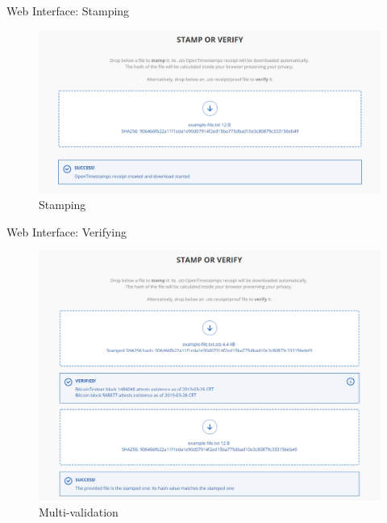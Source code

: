 \documentclass[usenames,dvipsnames]{beamer}
\begin{document}
     \begin{frame}{Web Interface: Stamping}
     \begin{figure}
         \centering
         \includegraphics[width=1\linewidth]{Images/stamping.png}
         \caption{Stamping}
         
     \end{figure}
    \end{frame}
    
    \begin{frame}{Web Interface: Verifying}
     \begin{figure}
         \centering
         \includegraphics[width=0.85\linewidth]{Images/multivalidation.png}
         \caption{Multi-validation}
         
     \end{figure}
    \end{frame}
    
\end{document}
